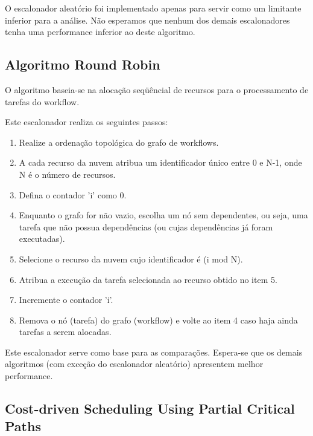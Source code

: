 \documentclass[a4paper,10pt, draft]{article}
\begin{document}
O escalonador aleatório foi implementado apenas para servir como um limitante inferior para a análise.
Não esperamos que nenhum dos demais escalonadores tenha uma performance inferior ao deste algoritmo.

\subsection{Algoritmo Round Robin}

O algoritmo baseia-se na alocação seqüêncial de recursos para o processamento de tarefas do workflow.

Este escalonador realiza os seguintes passos:

\begin{enumerate}

    \item Realize a ordenação topológica do grafo de workflows.

    \item A cada recurso da nuvem atribua um identificador único entre 0 e N-1, onde N é o número de recursos.

    \item Defina o contador 'i' como 0.

    \item Enquanto o grafo for não vazio, escolha um nó sem dependentes, ou seja, uma tarefa que não possua dependências 
(ou cujas dependências já foram executadas).

    \item Selecione o recurso da nuvem cujo identificador é (i mod N).

    \item Atribua a execução da tarefa selecionada ao recurso obtido no item 5.

    \item Incremente o contador 'i'.

    \item Remova o nó (tarefa) do grafo (workflow) e volte ao item 4 caso haja ainda tarefas a serem alocadas.

\end{enumerate}

Este escalonador serve como base para as comparações. Espera-se que os demais algoritmos (com exceção do escalonador
aleatório) apresentem melhor performance.

\subsection{Cost-driven Scheduling Using Partial Critical Paths}
\end{document}
